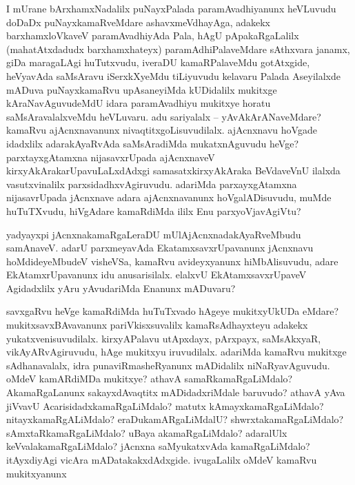 \begin{artha}
I mUrane bArxhamxNadalilx puNayxPalada paramAvadhiyanunx heVLuvudu doDaDx puNayxkamaRveMdare ashavxmeVdhayAga, adakekx barxhamxloVkaveV paramAvadhiyAda Pala, hAgU pApakaRgaLalilx (mahatAtxdadudx barxhamxhateyx) paramAdhiPalaveMdare sAthxvara janamx, giDa maragaLAgi huTutxvudu, iveraDU kamaRPalaveMdu gotAtxgide, heVyavAda saMsAravu iSerxkXyeMdu tiLiyuvudu kelavaru Palada Aseyilalxde mADuva puNayxkamaRvu upAsaneyiMda kUDidalilx mukitxge kAraNavAguvudeMdU idara paramAvadhiyu mukitxye horatu saMsAravalalxveMdu heVLuvaru. adu sariyalalx -- yAvAkArANaveMdare? kamaRvu ajAcnxnavanunx nivaqtitxgoLisuvudilalx. ajAcnxnavu hoVgade idadxlilx adarakAyaRvAda saMsAradiMda mukatxnAguvudu heVge? parxtayxgAtamxna nijasavxrUpada ajAcnxnaveV kirxyAkArakarUpavuLaLxdAdxgi samasatxkirxyAkAraka BeVdaveVnU ilalxda vasutxvinalilx parxsidadhxvAgiruvudu. adariMda parxayxgAtamxna nijasavrUpada jAcnxnave adara ajAcnxnavanunx hoVgalADisuvudu, muMde huTuTXvudu, hiVgAdare kamaRdiMda ililx Enu parxyoVjavAgiVtu?

yadyayxpi jAcnxnakamaRgaLeraDU mUlAjAcnxnadakAyaRveMbudu  samAnaveV. adarU parxmeyavAda EkatamxsavxrUpavanunx jAcnxnavu hoMdideyeMbudeV visheVSa, kamaRvu avideyxyanunx hiMbAlisuvudu, adare EkAtamxrUpavanunx idu anusarisilalx. elalxvU EkAtamxsavxrUpaveV Agidadxlilx yAru yAvudariMda Enanunx mADuvaru?
\end{artha}

\begin{center}
\end{center}

\begin{artha}
savxgaRvu heVge kamaRdiMda huTuTxvado hAgeye mukitxyUkUDa eMdare? mukitxsavxBAvavanunx pariVkisxsuvalilx kamaRsAdhayxteyu adakekx yukatxvenisuvudilalx. kirxyAPalavu utApxdayx, pArxpayx, saMsAkxyaR, vikAyARvAgiruvudu, hAge mukitxyu iruvudilalx. adariMda kamaRvu mukitxge sAdhanavalalx, idra punaviRmasheRyanunx mADidalilx niNaRyavAguvudu. oMdeV kamARdiMDa mukitxye? athavA samaRkamaRgaLiMdalo? AkamaRgaLanunx sakayxdAvaqtitx mADidadxriMdale baruvudo? athavA yAva jiVvavU AcarisidadxkamaRgaLiMdalo? matutx kAmayxkamaRgaLiMdalo? nitayxkamaRgALiMdalo? eraDukamARgaLiMdalU? shwrxtakamaRgaLiMdalo? sAmxtaRkamaRgaLiMdalo? uBaya akamaRgaLiMdalo? adaralUlx keVvalakamaRgaLiMdalo? jAcnxna saMyukatxvAda kamaRgaLiMdalo? itAyxdiyAgi vicAra mADatakakxdAdxgide. ivugaLalilx oMdeV kamaRvu mukitxyanunx 
\end{artha}

